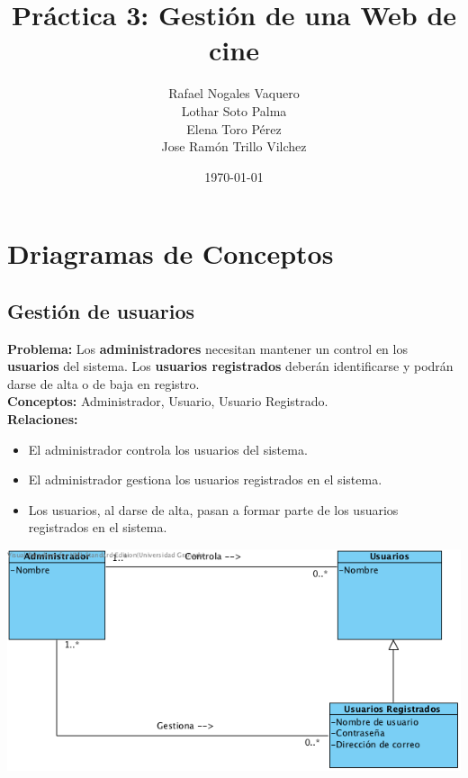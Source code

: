 \documentclass{article}
\title{Práctica 3: Gestión de una Web de cine}
\author{Rafael Nogales Vaquero
\\Lothar Soto Palma
\\Elena Toro Pérez
\\Jose Ramón Trillo Vilchez}
\date{\today}
\begin{document}
\maketitle

\section{Driagramas de Conceptos}
	\subsection*{Gestión de usuarios}
		\textbf{Problema:} Los \textbf{administradores} necesitan mantener un control en los \textbf{usuarios} del sistema.
Los \textbf{usuarios registrados} deberán identificarse y podrán darse de alta o de baja en registro.\\
\textbf{Conceptos:} Administrador, Usuario, Usuario Registrado.\\
\textbf{	Relaciones:}
	\begin{itemize}
    	\item El administrador controla los usuarios del sistema.
        \item El administrador gestiona los usuarios registrados en el sistema.
        \item Los usuarios, al darse de alta, pasan a formar parte de los usuarios registrados en el sistema.      	
    \end{itemize}
	\includegraphics[width=1\linewidth]{./C-Usuarios}


\end{document}
